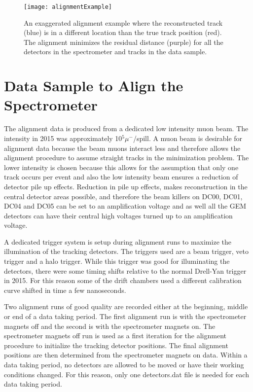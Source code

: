 \begin{figure}[h!t]
  \centering \texttt{[image: alignmentExample]}
  \caption{An exaggerated alignment example where the reconstructed track (blue)
    is in a different location than the true track position (red).  The
    alignment minimizes the residual distance (purple) for all the detectors in
    the spectrometer and tracks in the data sample.}
  \label{fig::alignmentExample}
\end{figure}



\section{Data Sample to Align the Spectrometer}

The alignment data is produced from a dedicated low intensity muon beam.  The
intensity in 2015 was approximately 10$^5 \mu^-$/spill.  A muon beam is
desirable for alignment data because the beam muons interact less and therefore
allows the alignment procedure to assume straight tracks in the minimization
problem.  The lower intensity is chosen because this allows for the assumption
that only one track occurs per event and also the low intensity beam ensures a
reduction of detector pile up effects.  Reduction in pile up effects, makes
reconstruction in the central detector areas possible, and therefore the beam
killers on DC00, DC01, DC04 and DC05 can be set to an amplification voltage and
as well all the GEM detectors can have their central high voltages turned up to
an amplification voltage.

A dedicated trigger system is setup during alignment runs to maximize the
illumination of the tracking detectors.  The triggers used are a beam trigger,
veto trigger and a halo trigger.  While this trigger was good for illuminating
the detectors, there were some timing shifts relative to the normal Drell-Yan
trigger in 2015.  For this reason some of the drift chambers used a different
calibration curve shifted in time a few nanoseconds.

Two alignment runs of good quality are recorded either at the beginning, middle
or end of a data taking period.  The first alignment run is with the
spectrometer magnets off and the second is with the spectrometer magnets on.
The spectrometer magnets off run is used as a first iteration for the alignment
procedure to initialize the tracking detector positions.  The final alignment
positions are then determined from the spectrometer magnets on data.  Within a
data taking period, no detectors are allowed to be moved or have their working
conditions changed.  For this reason, only one detectors.dat file is needed for
each data taking period.

